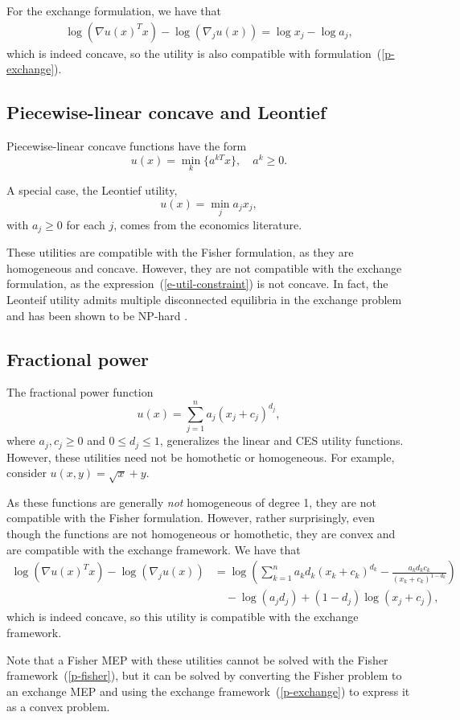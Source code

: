 \documentclass[12pt]{article}
\begin{document}
For the exchange formulation, we have that
\begin{align*}
\log(\nabla u(x)^T x) - \log(\nabla_j u(x)) =
\log x_j - \log a_j,
\end{align*}
which is indeed concave, so the utility is also compatible with
formulation~(\ref{p-exchange}).

\subsection{Piecewise-linear concave and Leontief}
Piecewise-linear concave functions have the form
\[
u(x) = \min_k\lbrace a^{kT}x \rbrace,\quad a^k \geq 0.
\]

A special case, the Leontief utility,
\[
u(x) = \min_j a_j x_j,
\]
with $a_j \geq 0$ for each $j$,  comes from the economics literature. 

These utilities are compatible with the Fisher formulation, as they are homogeneous and concave.
However, they are not compatible with the exchange formulation, as the expression~(\ref{e-util-constraint}) is not concave.
In fact, the Leonteif utility admits multiple disconnected equilibria in the exchange problem and has been shown to be NP-hard \cite{codenotti2006leontief}.

\subsection{Fractional power}
The fractional power function
\[
u(x) = \sum_{j=1}^n a_j (x_j+ c_j)^{d_j},
\]
where $a_j, c_j \geq 0$ and $0 \leq d_j \leq 1$,
generalizes the linear and CES utility functions.
However, these utilities need not be homothetic or homogeneous.
For example, consider $u(x,y) = \sqrt{x} + y$.

As these functions are generally \emph{not} homogeneous of degree 1,
they are not compatible with the Fisher formulation.
However, rather surprisingly, even though the
functions are not homogeneous or homothetic, they are
convex and are compatible with the exchange framework.
We have that
\begin{align*}
\log(\nabla u(x)^T x) - \log(\nabla_j u(x))
&= \log\left(\sum_{k=1}^n a_k d_k (x_k+c_k)^{d_k} - \frac{a_k d_k c_k}{(x_k + c_k)^{1-d_k}} \right)\\
&\quad- \log(a_j d_j) + (1-d_j)\log (x_j + c_j),
\end{align*}
which is indeed concave, so this utility is compatible with
the exchange framework.

Note that a Fisher MEP with these utilities cannot
be solved with the Fisher framework~(\ref{p-fisher}),
but it can be solved by converting the
Fisher problem to an exchange MEP and using the exchange framework~(\ref{p-exchange}) to express it as a convex problem.
\end{document}
